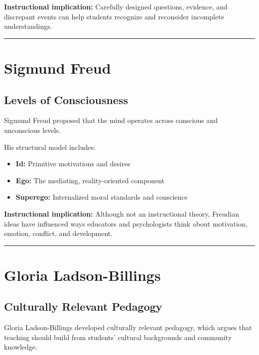 \documentclass[
  letterpaper,
  DIV=11,
  numbers=noendperiod]{scrartcl}
\providecommand{\tightlist}{%
  \setlength{\itemsep}{0pt}\setlength{\parskip}{0pt}}\usepackage{longtable,booktabs,array}
\begin{document}
\textbf{Instructional implication:} Carefully designed questions,
evidence, and discrepant events can help students recognize and
reconsider incomplete understandings.

\begin{center}\rule{0.5\linewidth}{0.5pt}\end{center}

\section{Sigmund Freud}\label{sigmund-freud}

\subsection{Levels of Consciousness}\label{levels-of-consciousness}

Sigmund Freud proposed that the mind operates across conscious and
unconscious levels.

His structural model includes:

\begin{itemize}
\tightlist
\item
  \textbf{Id:} Primitive motivations and desires
\item
  \textbf{Ego:} The mediating, reality-oriented component
\item
  \textbf{Superego:} Internalized moral standards and conscience
\end{itemize}

\textbf{Instructional implication:} Although not an instructional
theory, Freudian ideas have influenced ways educators and psychologists
think about motivation, emotion, conflict, and development.

\begin{center}\rule{0.5\linewidth}{0.5pt}\end{center}

\section{Gloria Ladson-Billings}\label{gloria-ladson-billings}

\subsection{Culturally Relevant
Pedagogy}\label{culturally-relevant-pedagogy}

Gloria Ladson-Billings developed culturally relevant pedagogy, which
argues that teaching should build from students' cultural backgrounds
and community knowledge.
\end{document}
